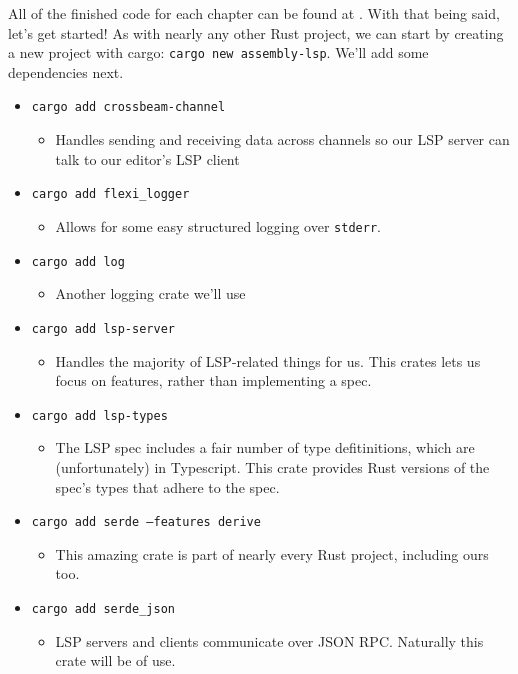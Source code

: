 All of the finished code for each chapter can be found at \URL. With that being said,
let's get started! As with nearly any other Rust project, we can start by creating a new
project with cargo: \texttt{cargo new assembly-lsp}. We'll add some dependencies
next. 

\begin{itemize}
    \item \texttt{cargo add crossbeam-channel}
        \begin{itemize}
            \item Handles sending and receiving data across channels so our LSP server
                can talk to our editor's LSP client
        \end{itemize}
    \item \texttt{cargo add flexi\_logger}
        \begin{itemize}
            \item Allows for some easy structured logging over \texttt{stderr}.
        \end{itemize}
    \item \texttt{cargo add log}
        \begin{itemize}
            \item Another logging crate we'll use
        \end{itemize}
    \item \texttt{cargo add lsp-server}
        \begin{itemize}
            \item Handles the majority of LSP-related things for us. This crates
                lets us focus on features, rather than implementing a spec.
        \end{itemize}
    \item \texttt{cargo add lsp-types}
        \begin{itemize}
            \item The LSP spec includes a fair number of type defitinitions, which
                are (unfortunately) in Typescript. This crate provides Rust versions
                of the spec's types that adhere to the spec.
        \end{itemize}
    \item \texttt{cargo add serde --features derive}
        \begin{itemize}
            \item This amazing crate is part of nearly every Rust project, including
                ours too.
        \end{itemize}
    \item \texttt{cargo add serde\_json}
        \begin{itemize}
            \item LSP servers and clients communicate over JSON RPC. Naturally this
                crate will be of use.
        \end{itemize}
\end{itemize}

